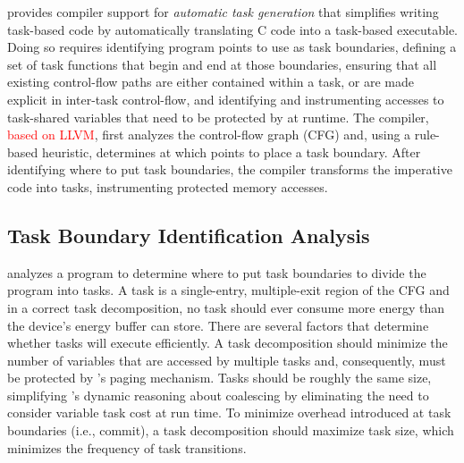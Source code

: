 \sys provides compiler support for \emph{automatic task generation} that simplifies writing task-based code by automatically translating C code into a task-based executable. Doing so requires identifying program points to use as task boundaries, defining a set of task functions that begin and end at those boundaries, ensuring that all existing control-flow paths are either contained within a task, or are made explicit in inter-task control-flow, and identifying and instrumenting accesses to task-shared variables that need to be protected by \sys at runtime. The \sys compiler, \textcolor{red}{based on LLVM}, first analyzes the control-flow graph (CFG) and, using a rule-based heuristic, determines at which points to place a task boundary. After identifying where to put task boundaries, the \sys compiler transforms the imperative code into tasks, instrumenting protected memory accesses. 

\subsection{Task Boundary Identification Analysis}
\label{sec:compiler_analysis_pass}

\sys analyzes a program to determine where to put task boundaries to divide the program into tasks. A task is a single-entry, multiple-exit region of the CFG and in a correct task decomposition, no task should ever consume more energy than the device's energy buffer can store. There are several factors that determine whether tasks will execute efficiently. A task decomposition should minimize the number of variables that are accessed by multiple tasks and, consequently, must be protected by \sys's paging mechanism. Tasks should be roughly the same size, simplifying \sys's dynamic reasoning about coalescing by eliminating the need to consider variable task cost at run time. To minimize overhead introduced at task boundaries (i.e., commit), a task decomposition should maximize task size, which minimizes the frequency of task transitions.

%
%

